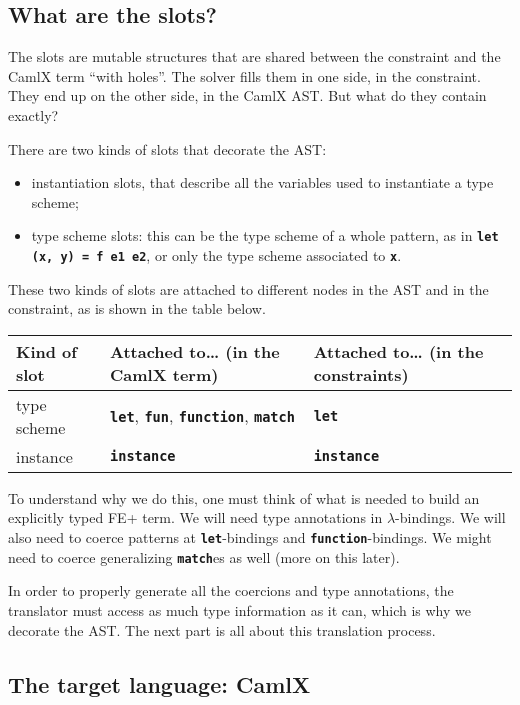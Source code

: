 \documentclass[10pt,a4paper,twoside,titlepage,twocolumn]{article}
\newcommand{\code}[1]{\textbf{\texttt{#1}}}
\begin{document}
\subsection{What are the slots?}

The slots are mutable structures that are shared between the constraint and the
CamlX term ``with holes''. The solver fills them in one side, in the constraint.
They end up on the other side, in the CamlX AST. But what do they contain
exactly?

There are two kinds of slots that decorate the AST:
\begin{itemize}
  \item instantiation slots, that describe all the variables used to
    instantiate a type scheme;
  \item type scheme slots: this can be the type scheme of a whole pattern,
    as in \code{let (x, y) = f e1 e2}, or only the type scheme associated to
    \code{x}.
\end{itemize}

These two kinds of slots are attached to different nodes in the AST and in the
constraint, as is shown in the table below.

\begin{center}
  \small
  \begin{tabular}{l|p{2.5cm}|p{2.5cm}}
    \textbf{Kind of slot} & Attached to… (\textbf{in the CamlX term}) & Attached
    to… (\textbf{in the constraints}) \\
    \hline
    type scheme & \code{let}, \code{fun}, \code{function}, \code{match} & \code{let} \\
    \hline
    instance    & \code{instance} & \code{instance}
  \end{tabular}
\end{center}

To understand why we do this, one must think of what is needed to build an
explicitly typed FE+ term. We will need type annotations in
$\lambda$-bindings. We will also need to coerce patterns at \code{let}-bindings
and \code{function}-bindings.  We might need to coerce generalizing
\code{match}es as well (more on this later).

In order to properly generate all the coercions and type annotations, the
translator must access as much type information as it can, which is why we
decorate the AST. The next part is all about this translation process.

\subsection{The target language: CamlX}
\end{document}
